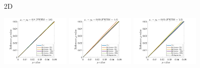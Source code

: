 \documentclass{article}
\begin{document}
\begin{figure}[!htp]
\centering
\begin{sideways}
\phantom{------------------}2D
\end{sideways}
\includegraphics[trim=80 5 80 5, clip,width=0.3\textwidth]{figure/2D_rho1_0.9_rho2_0.9.jpg}
\includegraphics[trim=80 5 80 5, clip,width=0.3\textwidth]{figure/2D_rho1_0.93_rho2_0.93.jpg}
\includegraphics[trim=80 5 80 5, clip,width=0.3\textwidth]{figure/2D_rho1_0.95_rho2_0.95.jpg}


\end{figure}
\end{document}
